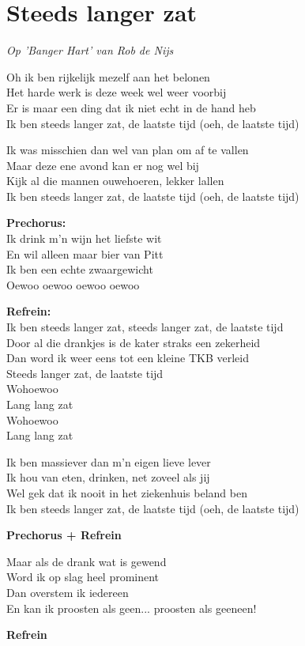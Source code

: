 \section{Steeds langer zat}
\textit{Op 'Banger Hart' van Rob de Nijs}

Oh ik ben rijkelijk mezelf aan het belonen\\
Het harde werk is deze week wel weer voorbij\\
Er is maar een ding dat ik niet echt in de hand heb\\
Ik ben steeds langer zat, de laatste tijd (oeh, de laatste tijd)

Ik was misschien dan wel van plan om af te vallen\\
Maar deze ene avond kan er nog wel bij\\
Kijk al die mannen ouwehoeren, lekker lallen\\
Ik ben steeds langer zat, de laatste tijd (oeh, de laatste tijd)

\textbf{Prechorus:}\\
Ik drink m'n wijn het liefste wit\\
En wil alleen maar bier van Pitt\\
Ik ben een echte zwaargewicht\\
Oewoo oewoo oewoo oewoo

\textbf{Refrein:}\\
Ik ben steeds langer zat, steeds langer zat, de laatste tijd\\
Door al die drankjes is de kater straks een zekerheid\\
Dan word ik weer eens tot een kleine TKB verleid\\
Steeds langer zat, de laatste tijd\\
Wohoewoo\\
Lang lang zat\\
Wohoewoo\\
Lang lang zat

Ik ben massiever dan m'n eigen lieve lever\\
Ik hou van eten, drinken, net zoveel als jij\\
Wel gek dat ik nooit in het ziekenhuis beland ben\\
Ik ben steeds langer zat, de laatste tijd (oeh, de laatste tijd)

\textbf{Prechorus + Refrein}

Maar als de drank wat is gewend\\
Word ik op slag heel prominent\\
Dan overstem ik iedereen\\
En kan ik proosten als geen... proosten als geeneen!

\textbf{Refrein}